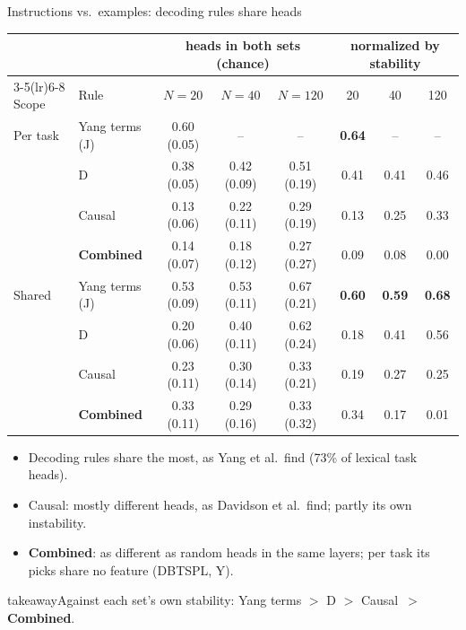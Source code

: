 \documentclass[aspectratio=169,11pt,xcolor=table]{beamer}
\newcommand{\takeaway}[1]{\vfill
  \begin{beamercolorbox}[wd=\textwidth,sep=6pt]{takeaway}#1\end{beamercolorbox}}
\newcommand{\Sel}{\textcolor{cSel}{\textbf{Combined}}}
\newcommand{\Causal}{\textcolor{cCaus}{Causal}}
\begin{document}
\begin{frame}{Instructions vs.\ examples: decoding rules share heads}
\centering\footnotesize
\begin{tabular}{@{}llccc@{\hspace{1.6em}}ccc@{}}
\toprule
 & & \multicolumn{3}{c}{heads in both sets (chance)} & \multicolumn{3}{c}{normalized by stability} \\
\cmidrule(lr){3-5}\cmidrule(lr){6-8}
Scope & Rule & $N=20$ & $N=40$ & $N=120$ & 20 & 40 & 120 \\
\midrule
Per task & Yang terms (J) & 0.60 (0.05) & -- & -- & \textbf{0.64} & -- & -- \\
 & D & 0.38 (0.05) & 0.42 (0.09) & 0.51 (0.19) & 0.41 & 0.41 & 0.46 \\
 & \Causal & 0.13 (0.06) & 0.22 (0.11) & 0.29 (0.19) & 0.13 & 0.25 & 0.33 \\
 & \Sel & 0.14 (0.07) & 0.18 (0.12) & 0.27 (0.27) & 0.09 & 0.08 & 0.00 \\
\midrule
Shared & Yang terms (J) & 0.53 (0.09) & 0.53 (0.11) & 0.67 (0.21) & \textbf{0.60} & \textbf{0.59} & \textbf{0.68} \\
 & D & 0.20 (0.06) & 0.40 (0.11) & 0.62 (0.24) & 0.18 & 0.41 & 0.56 \\
 & \Causal & 0.23 (0.11) & 0.30 (0.14) & 0.33 (0.21) & 0.19 & 0.27 & 0.25 \\
 & \Sel & 0.33 (0.11) & 0.29 (0.16) & 0.33 (0.32) & 0.34 & 0.17 & 0.01 \\
\bottomrule
\end{tabular}

\vspace{0.6em}
\raggedright\small
\begin{itemize}
\item Decoding rules share the most, as Yang et al.\ find (73\% of lexical task heads).
\item \Causal: mostly different heads, as Davidson et al.\ find; partly its own instability.
\item \Sel: as different as random heads in the same layers; per task its picks share no feature (DBTSPL, Y).
\end{itemize}
\takeaway{Against each set's own stability: Yang terms $>$ D $>$ \Causal\ $>$ \Sel.}
\end{frame}
\end{document}
